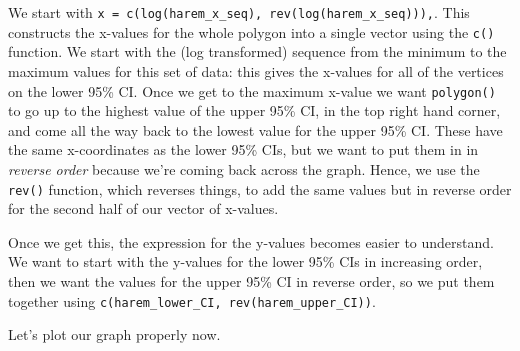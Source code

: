 \documentclass[
]{book}
\begin{document}
We start with \texttt{x\ =\ c(log(harem\_x\_seq),\ rev(log(harem\_x\_seq))),}. This constructs the x-values for the whole polygon into a single vector using the \texttt{c()} function. We start with the (log transformed) sequence from the minimum to the maximum values for this set of data: this gives the x-values for all of the vertices on the lower 95\% CI. Once we get to the maximum x-value we want \texttt{polygon()} to go up to the highest value of the upper 95\% CI, in the top right hand corner, and come all the way back to the lowest value for the upper 95\% CI. These have the same x-coordinates as the lower 95\% CIs, but we want to put them in in \emph{reverse order} because we're coming back across the graph. Hence, we use the \texttt{rev()} function, which reverses things, to add the same values but in reverse order for the second half of our vector of x-values.

Once we get this, the expression for the y-values becomes easier to understand. We want to start with the y-values for the lower 95\% CIs in increasing order, then we want the values for the upper 95\% CI in reverse order, so we put them together using \texttt{c(harem\_lower\_CI,\ rev(harem\_upper\_CI))}.

Let's plot our graph properly now.
\end{document}

